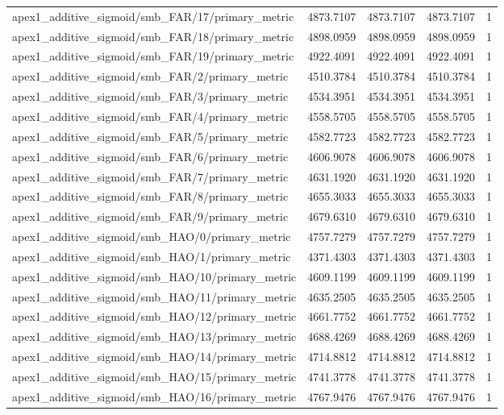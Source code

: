\begin{table}[h]
\begin{tabular}{lrrrr}
apex1_additive_sigmoid/smb_FAR/17/primary_metric & 4873.7107 & 4873.7107 & 4873.7107 & 1 \\
apex1_additive_sigmoid/smb_FAR/18/primary_metric & 4898.0959 & 4898.0959 & 4898.0959 & 1 \\
apex1_additive_sigmoid/smb_FAR/19/primary_metric & 4922.4091 & 4922.4091 & 4922.4091 & 1 \\
apex1_additive_sigmoid/smb_FAR/2/primary_metric & 4510.3784 & 4510.3784 & 4510.3784 & 1 \\
apex1_additive_sigmoid/smb_FAR/3/primary_metric & 4534.3951 & 4534.3951 & 4534.3951 & 1 \\
apex1_additive_sigmoid/smb_FAR/4/primary_metric & 4558.5705 & 4558.5705 & 4558.5705 & 1 \\
apex1_additive_sigmoid/smb_FAR/5/primary_metric & 4582.7723 & 4582.7723 & 4582.7723 & 1 \\
apex1_additive_sigmoid/smb_FAR/6/primary_metric & 4606.9078 & 4606.9078 & 4606.9078 & 1 \\
apex1_additive_sigmoid/smb_FAR/7/primary_metric & 4631.1920 & 4631.1920 & 4631.1920 & 1 \\
apex1_additive_sigmoid/smb_FAR/8/primary_metric & 4655.3033 & 4655.3033 & 4655.3033 & 1 \\
apex1_additive_sigmoid/smb_FAR/9/primary_metric & 4679.6310 & 4679.6310 & 4679.6310 & 1 \\
apex1_additive_sigmoid/smb_HAO/0/primary_metric & 4757.7279 & 4757.7279 & 4757.7279 & 1 \\
apex1_additive_sigmoid/smb_HAO/1/primary_metric & 4371.4303 & 4371.4303 & 4371.4303 & 1 \\
apex1_additive_sigmoid/smb_HAO/10/primary_metric & 4609.1199 & 4609.1199 & 4609.1199 & 1 \\
apex1_additive_sigmoid/smb_HAO/11/primary_metric & 4635.2505 & 4635.2505 & 4635.2505 & 1 \\
apex1_additive_sigmoid/smb_HAO/12/primary_metric & 4661.7752 & 4661.7752 & 4661.7752 & 1 \\
apex1_additive_sigmoid/smb_HAO/13/primary_metric & 4688.4269 & 4688.4269 & 4688.4269 & 1 \\
apex1_additive_sigmoid/smb_HAO/14/primary_metric & 4714.8812 & 4714.8812 & 4714.8812 & 1 \\
apex1_additive_sigmoid/smb_HAO/15/primary_metric & 4741.3778 & 4741.3778 & 4741.3778 & 1 \\
apex1_additive_sigmoid/smb_HAO/16/primary_metric & 4767.9476 & 4767.9476 & 4767.9476 & 1 \\

\end{tabular}
\end{table}
